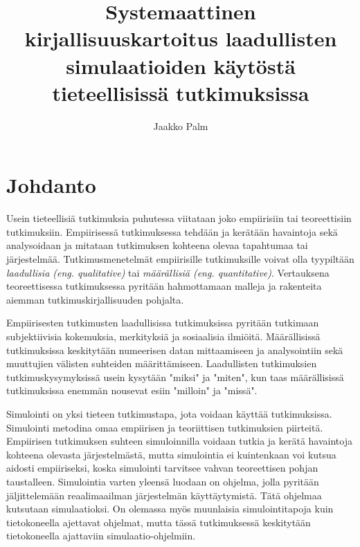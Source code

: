 \documentclass[utf8]{gradu3}
\begin{document}
\title{Systemaattinen kirjallisuuskartoitus laadullisten simulaatioiden käytöstä tieteellisissä tutkimuksissa}
\abstract{%
  
}

\author{Jaakko Palm}

\maketitle

\mainmatter

\chapter{Johdanto} \label{johdanto}
Usein tieteellisiä tutkimuksia puhutessa viitataan joko empiirisiin 
tai teoreettisiin tutkimuksiin. Empiirisessä tutkimuksessa tehdään 
ja kerätään havaintoja sekä analysoidaan 
ja mitataan tutkimuksen kohteena olevaa tapahtumaa tai järjestelmää. 
Tutkimusmenetelmät empiirisille tutkimuksille voivat olla 
tyypiltään \textit{laadullisia (eng. qualitative)} 
tai \textit{määrällisiä (eng. quantitative)}. 
Vertauksena teoreettisessa tutkimuksessa pyritään hahmottamaan 
malleja ja rakenteita aiemman tutkimuskirjallisuuden pohjalta. 

Empiirisesten tutkimusten laadullisissa tutkimuksissa pyritään tutkimaan subjektiivisia kokemuksia, merkityksiä ja sosiaalisia ilmiöitä. Määrällisissä tutkimuksissa keskitytään
numeerisen datan mittaamiseen ja analysointiin sekä muuttujien välisten suhteiden määrittämiseen. 
Laadullisten tutkimuksien tutkimuskysymyksissä usein kysytään "miksi" ja "miten", 
kun taas määrällisissä tutkimuksissa enemmän nousevat esiin "milloin" ja "missä".

Simulointi on yksi tieteen tutkimustapa, jota voidaan käyttää tutkimuksissa.
Simulointi metodina omaa empiirisen ja teoriittisen tutkimuksien piirteitä.
Empiirisen tutkimuksen suhteen simuloinnilla voidaan tutkia ja kerätä havaintoja
kohteena olevasta järjestelmästä, mutta simulointia ei 
kuintenkaan voi kutsua aidosti empiiriseksi,
koska simulointi tarvitsee vahvan teoreettisen pohjan taustalleen.
Simulointia varten yleensä luodaan on ohjelma, 
jolla pyritään jäljittelemään reaalimaailman järjestelmän käyttäytymistä.
Tätä ohjelmaa kutsutaan simulaatioksi.
On olemassa myös muunlaisia simulointitapoja kuin tietokoneella ajettavat ohjelmat, mutta 
tässä tutkimuksessä keskitytään tietokoneella ajattaviin simulaatio-ohjelmiin.
\end{document}

